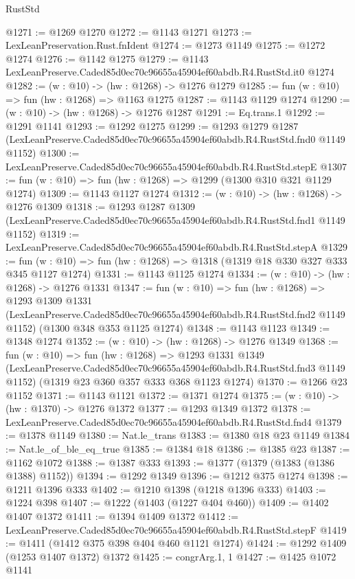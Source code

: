 \begin{lexlean}{RustStd}
\begin{coremodule}
@1271 := @1269 @1270
@1272 := @1143 @1271
@1273 := LexLeanPreservation.Rust.fnIdent
@1274 := @1273 @1149
@1275 := @1272 @1274
@1276 := @1142 @1275
@1279 := @1143 LexLeanPreserve.Caded85d0ec70c96655a45904ef60abdb.R4.RustStd.it0 @1274
@1282 := (w : @10) -> (hw : @1268) -> @1276 @1279
@1285 := fun (w : @10) => fun (hw : @1268) => @1163 @1275
@1287 := @1143 @1129 @1274
@1290 := (w : @10) -> (hw : @1268) -> @1276 @1287
@1291 := Eq.trans.{1}
@1292 := @1291 @1141
@1293 := @1292 @1275
@1299 := @1293
    @1279
    @1287
    (LexLeanPreserve.Caded85d0ec70c96655a45904ef60abdb.R4.RustStd.fnd0 @1149 @1152)
@1300 := LexLeanPreserve.Caded85d0ec70c96655a45904ef60abdb.R4.RustStd.stepE
@1307 := fun (w : @10) => fun (hw : @1268) => @1299 (@1300 @310 @321 @1129 @1274)
@1309 := @1143 @1127 @1274
@1312 := (w : @10) -> (hw : @1268) -> @1276 @1309
@1318 := @1293
    @1287
    @1309
    (LexLeanPreserve.Caded85d0ec70c96655a45904ef60abdb.R4.RustStd.fnd1 @1149 @1152)
@1319 := LexLeanPreserve.Caded85d0ec70c96655a45904ef60abdb.R4.RustStd.stepA
@1329 := fun (w : @10) => fun (hw : @1268) => @1318 (@1319 @18 @330 @327 @333 @345 @1127 @1274)
@1331 := @1143 @1125 @1274
@1334 := (w : @10) -> (hw : @1268) -> @1276 @1331
@1347 := fun (w : @10) =>
  fun (hw : @1268) =>
  @1293
    @1309
    @1331
    (LexLeanPreserve.Caded85d0ec70c96655a45904ef60abdb.R4.RustStd.fnd2 @1149 @1152)
    (@1300 @348 @353 @1125 @1274)
@1348 := @1143 @1123
@1349 := @1348 @1274
@1352 := (w : @10) -> (hw : @1268) -> @1276 @1349
@1368 := fun (w : @10) =>
  fun (hw : @1268) =>
  @1293
    @1331
    @1349
    (LexLeanPreserve.Caded85d0ec70c96655a45904ef60abdb.R4.RustStd.fnd3 @1149 @1152)
    (@1319 @23 @360 @357 @333 @368 @1123 @1274)
@1370 := @1266 @23 @1152
@1371 := @1143 @1121
@1372 := @1371 @1274
@1375 := (w : @10) -> (hw : @1370) -> @1276 @1372
@1377 := @1293 @1349 @1372
@1378 := LexLeanPreserve.Caded85d0ec70c96655a45904ef60abdb.R4.RustStd.fnd4
@1379 := @1378 @1149
@1380 := Nat.le_trans
@1383 := @1380 @18 @23 @1149
@1384 := Nat.le_of_ble_eq_true
@1385 := @1384 @18
@1386 := @1385 @23
@1387 := @1162 @1072
@1388 := @1387 @333
@1393 := @1377 (@1379 (@1383 (@1386 @1388) @1152))
@1394 := @1292 @1349
@1396 := @1212 @375 @1274
@1398 := @1211 @1396 @333
@1402 := @1210 @1398 (@1218 @1396 @333)
@1403 := @1224 @398
@1407 := @1222 (@1403 (@1227 @404 @460))
@1409 := @1402 @1407 @1372
@1411 := @1394 @1409 @1372
@1412 := LexLeanPreserve.Caded85d0ec70c96655a45904ef60abdb.R4.RustStd.stepF
@1419 := @1411 (@1412 @375 @398 @404 @460 @1121 @1274)
@1424 := @1292 @1409 (@1253 @1407 @1372) @1372
@1425 := congrArg.{1, 1}
@1427 := @1425 @1072 @1141

\end{coremodule}
\end{lexlean}
